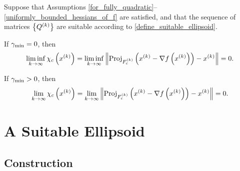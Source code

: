 \documentclass{article}
\begin{document}
\begin{theorem}\label{main_result}
Suppose that Assumptions \cref{for_fully_quadratic}--\cref{uniformly_bounded_hessians_of_f} are satisfied,
and that the sequence of matrices $\left\{{Q^{(k)}}\right\}$ are suitable according to \cref{define_suitable_ellipsoid}.


If $\gamma_{\textrm{min}} = 0$, then
\begin{align*}
\liminf_{k\to\infty} \chi_c\left(x^{(k)}\right) = \liminf_{k\to\infty} \left\|{\textrm{Proj}}_{{F_c^{(k)}}}\left(x^{(k)} - \nabla f\left(x^{(k)}\right)\right) - x^{(k)} \right\| = 0.
\end{align*}

If $\gamma_{\textrm{min}} > 0$, then
\begin{align*}
\lim_{k\to\infty} \chi_c\left(x^{(k)}\right) = \lim_{k\to\infty} \left\|{\textrm{Proj}}_{{F_c^{(k)}}}\left(x^{(k)} - \nabla f\left(x^{(k)}\right)\right) - x^{(k)} \right\| = 0.
\end{align*}
\end{theorem}




\section{A Suitable Ellipsoid}
\label{sec:ellipsoidal}
%
%



\subsection{Construction}
\label{the_safe_ellipsoid}
\end{document}
